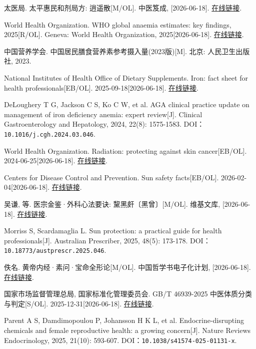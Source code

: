 \begin{enumerate}[label={[Q\arabic*]},leftmargin=*]
  \item 太医局. 太平惠民和剂局方: 逍遥散[M/OL]. 中医笈成, [2026-06-18]. \href{https://jicheng.tw/tcm/book/太平惠民和剂局方_1/index.html}{在线链接}.
  \item World Health Organization. WHO global anaemia estimates: key findings, 2025[R/OL]. Geneva: World Health Organization, 2025[2026-06-18]. \href{https://www.who.int/publications/i/item/9789240113930}{在线链接}.
  \item 中国营养学会. 中国居民膳食营养素参考摄入量(2023版)[M]. 北京: 人民卫生出版社, 2023.
  \item National Institutes of Health Office of Dietary Supplements. Iron: fact sheet for health professionals[EB/OL]. 2025-09-18[2026-06-18]. \href{https://ods.od.nih.gov/factsheets/Iron-HealthProfessional/}{在线链接}.
  \item DeLoughery T G, Jackson C S, Ko C W, et al. AGA clinical practice update on management of iron deficiency anemia: expert review[J]. Clinical Gastroenterology and Hepatology, 2024, 22(8): 1575-1583. DOI：\nolinkurl{10.1016/j.cgh.2024.03.046}.
  \item World Health Organization. Radiation: protecting against skin cancer[EB/OL]. 2024-06-25[2026-06-18]. \href{https://www.who.int/news-room/questions-and-answers/item/radiation-protecting-against-skin-cancer}{在线链接}.
  \item Centers for Disease Control and Prevention. Sun safety facts[EB/OL]. 2026-02-04[2026-06-18]. \href{https://www.cdc.gov/skin-cancer/sun-safety/index.html}{在线链接}.
  \item 吴谦, 等. 医宗金鉴·外科心法要诀: 黧黑皯〔黑曾〕[M/OL]. 维基文库, [2026-06-18]. \href{https://zh.wikisource.org/zh-hans/醫宗金鑒/外科卷上}{在线链接}.
  \item Morriss S, Scardamaglia L. Sun protection: a practical guide for health professionals[J]. Australian Prescriber, 2025, 48(5): 173-178. DOI：\nolinkurl{10.18773/austprescr.2025.046}.
  \item 佚名. 黄帝内经·素问·宝命全形论[M/OL]. 中国哲学书电子化计划, [2026-06-18]. \href{https://ctext.org/huangdi-neijing/bao-ming-quan-xing-lun/zhs}{在线链接}.
  \item 国家市场监督管理总局, 国家标准化管理委员会. GB/T 46939-2025 中医体质分类与判定[S/OL]. 2025-12-31[2026-06-18]. \href{https://openstd.samr.gov.cn/bzgk/std/newGbInfo?hcno=827D6D266BA52A2983F93638DA871028}{在线链接}.
  \item Parent A S, Damdimopoulou P, Johansson H K L, et al. Endocrine-disrupting chemicals and female reproductive health: a growing concern[J]. Nature Reviews Endocrinology, 2025, 21(10): 593-607. DOI：\nolinkurl{10.1038/s41574-025-01131-x}.

\end{enumerate}
